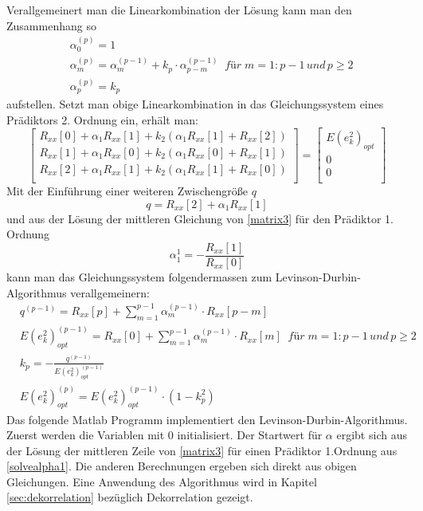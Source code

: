\documentclass[
    10pt, %
    DIV12,
    english, %
    a5paper, %
    twoside, %
    titlepage, %
    parskip=half, %
    headings=small, %
    listof=totoc, %
    bibliography=totoc, %
    index=totoc, %
    captions=tableheading, %
    final %
]{scrbook}
\begin{document}
Verallgemeinert man die Linearkombination der Lösung kann man den Zusammenhang so
\begin{align}
&\alpha_0^{(p)}=1\nonumber\\
&\alpha_m^{(p)}=\alpha_m^{(p-1)}+k_p\cdot \alpha_{p-m}^{(p-1)}\;\;für\;m=1:p-1\,und\,p\ge 2\nonumber\\
&\alpha_p^{(p)}=k_p\nonumber
\end{align}
aufstellen. Setzt man obige Linearkombination in das Gleichungssystem eines Prädiktors 2. Ordnung ein, erhält man:
\begin{equation}\label{matrix3}
\begin{bmatrix} 
R_{xx}[0] + \alpha_1 R_{xx}[1] + k_2 \left(\alpha_1 R_{xx}[1] + R_{xx}[2]\right)\\
R_{xx}[1] + \alpha_1 R_{xx}[0] + k_2 \left(\alpha_1 R_{xx}[0] + R_{xx}[1]\right)\\
R_{xx}[2] + \alpha_1 R_{xx}[1] + k_2 \left(\alpha_1 R_{xx}[1] + R_{xx}[0]\right)\\
\end{bmatrix} 
=
\begin{bmatrix} 
E(e_k^2)_{opt}\\
0\\
0\\
\end{bmatrix}
\end{equation}
Mit der Einführung einer weiteren Zwischengröße $q$ 
\begin{equation}\label{introduceq}
q=R_{xx}[2] + \alpha_1 R_{xx}[1]\nonumber
\end{equation}
und aus der Lösung der mittleren Gleichung von \eqref{matrix3} für den Prädiktor 1. Ordnung 
\begin{equation}\label{solvealpha1}
\alpha_1^1 = - \frac{R_{xx}[1]}{R_{xx}[0]}
\end{equation}
kann man das Gleichungssystem folgendermassen zum Levinson-Durbin-Algorithmus verallgemeinern:
\begin{align}
&q^{(p-1)}=R_{xx}[p]+\sum_{m=1}^{p-1}\alpha_m^{(p-1)}\cdot R_{xx}[p-m]\nonumber\\
&E(e_k^2)_{opt}^{(p-1)}=R_{xx}[0]+\sum_{m=1}^{p-1}\alpha_m^{(p-1)}\cdot R_{xx}[m]\;\;für\;m=1:p-1\,und\,p\ge 2\nonumber\\
&k_p=-\frac{q^{(p-1)}}{E(e_k^2)_{opt}^{(p-1)}}\nonumber\\
&E(e_k^2)_{opt}^{(p)}=E(e_k^2)_{opt}^{(p-1)}\cdot (1-k_p^2)\nonumber
\end{align}
Das folgende Matlab Programm  implementiert den Levinson-Durbin-Algorithmus. Zuerst werden die Variablen mit 0 initialisiert. Der Startwert für $\alpha$
ergibt sich aus der Lösung der mittleren Zeile von \eqref{matrix3} für einen Prädiktor 1.Ordnung aus \eqref{solvealpha1}. Die anderen Berechnungen ergeben sich direkt aus obigen Gleichungen.
%
Eine Anwendung des Algorithmus wird in Kapitel \ref{sec:dekorrelation} bezüglich Dekorrelation gezeigt.
\end{document}
